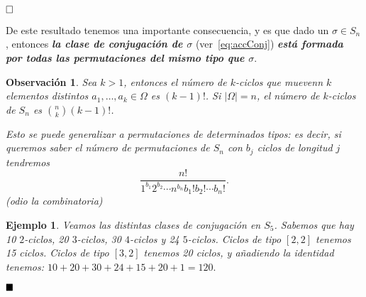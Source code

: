 \documentclass[12pt]{article}
\newtheorem{example}{Ejemplo}[theorem]
\newtheorem{observation}{Observación}[theorem]
\begin{document}
$\hfill \square$

De este resultado tenemos una importante consecuencia, y es que dado un $\sigma \in S_{n}$, entonces \textbf{\textit{la clase de conjugación de $\sigma$}} (ver~\ref{eq:accConj}) \textbf{\textit{está formada por todas las permutaciones del mismo tipo que $\sigma$}}.

\begin{observation} Sea $k>1$, entonces el número de $k$-ciclos que muevenn $k$ elementos distintos $a_{1}, \ldots, a_{k} \in \Omega$ es $(k-1)!$. Si $|\Omega| = n$, el número de $k$-ciclos de $S_{n}$ es ${n \choose k} (k-1)!$.

Esto se puede generalizar a permutaciones de determinados tipos: es decir, si queremos saber el número de permutaciones de $S_{n}$ con $b_{j}$ ciclos de longitud $j$ tendremos $$ \dfrac{n!}{1^{b_{1}}2^{b_{2}} \cdots n^{b_{n}}b_{1}!b_{2}!\cdots b_{n}!}.$$(odio la combinatoria)
\end{observation}

\begin{example}
Veamos las distintas clases de conjugación en $S_{5}$. Sabemos que hay 10 $2$-ciclos, 20 $3$-ciclos, 30 $4$-ciclos y 24 $5$-ciclos. Ciclos de tipo $[2,2]$ tenemos 15 ciclos. Ciclos de tipo $[3,2]$ tenemos 20 ciclos, y añadiendo la identidad tenemos: $10+20+30+24+15+20+1 = 120.$
\end{example}

$\hfill \blacksquare$
\end{document}

